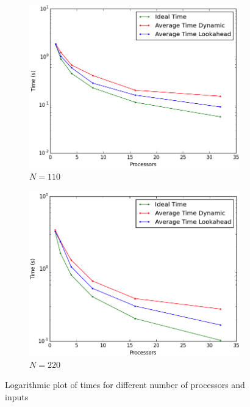 \documentclass[letterpaper,twoside,11pt]{article}
\begin{document}
\begin{multicols}{2}
\begin{figure}
  \centering
  \begin{subfigure}{.5\textwidth}
    \centering
    \includegraphics[width=.93\textwidth]{../3 Analysis/time_110.png}
    \caption{$N = 110$}
    \label{fig:times110}
  \end{subfigure}%
  \begin{subfigure}{.5\textwidth}
    \centering
    \includegraphics[width=.93\textwidth]{../3 Analysis/time_220.png}
    \caption{$N = 220$}
    \label{fig:times220}
  \end{subfigure}
  \caption{Logarithmic plot of times for different number of processors and inputs}
  \label{fig:times}
\end{figure}


\end{multicols}
\end{document}
